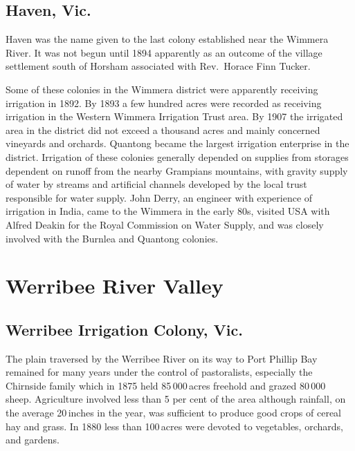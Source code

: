 \subsection*{Haven, Vic.}

Haven was the name given to the last colony established near the
Wimmera River.  It was not begun until 1894
apparently as an outcome of the village settlement south of Horsham
associated with Rev.~Horace Finn Tucker.

Some of these colonies in the Wimmera district were apparently
receiving irrigation in 1892.  By 1893 a few hundred acres were
recorded as receiving irrigation in the Western Wimmera Irrigation
Trust area.  By 1907 the
irrigated area in the district did not exceed a thousand acres and
mainly concerned vineyards and
orchards. Quantong became the largest irrigation
enterprise in the district.  Irrigation of these colonies generally
depended on supplies from storages dependent on runoff from the nearby
Grampians mountains, with gravity supply of water by streams and
artificial channels developed by the local
trust responsible for water supply. John Derry, 
an engineer with experience of irrigation in India, came to the
Wimmera in the early 80s, visited USA with Alfred
Deakin for the Royal Commission on Water Supply, and
was closely involved with the Burnlea and Quantong colonies.

\section*{Werribee River Valley}

\subsection*{Werribee Irrigation Colony, Vic.}
 

The plain traversed by the Werribee River on its way to Port Phillip
Bay remained for many years under the control of pastoralists,
especially the Chirnside family which in 1875 held 85\,000\,acres
freehold and grazed 80\,000 sheep.  Agriculture involved
less than 5 per cent of the area although rainfall, on the average
20\,inches in the year, was sufficient to produce good crops of
cereal hay and grass.  In 1880 less than 100\,acres were
devoted to vegetables, orchards, and
gardens.

